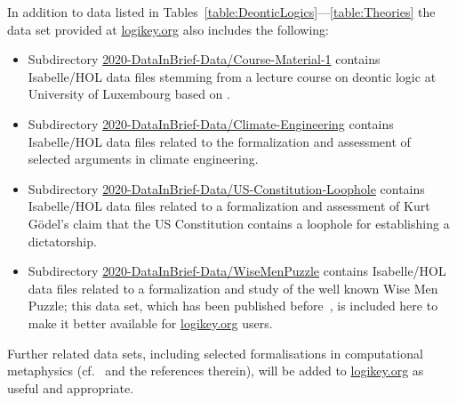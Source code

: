 \documentclass{article}
\begin{document}
In addition to data listed in
Tables~\ref{table:DeonticLogics}---\ref{table:Theories} the data set
provided at \url{logikey.org} also includes the following:
\begin{itemize}
\item Subdirectory \url{2020-DataInBrief-Data/Course-Material-1} contains Isabelle/HOL data files stemming from a
  lecture course on deontic logic at University of Luxembourg based on \cite{textbook18}.
\item Subdirectory \url{2020-DataInBrief-Data/Climate-Engineering} contains Isabelle/HOL data files related to the
  formalization and assessment  \cite{C82}  of selected arguments in climate engineering.
\item  Subdirectory \url{2020-DataInBrief-Data/US-Constitution-Loophole} contains Isabelle/HOL data files related to a 
  formalization and assessment  \cite{zahoransky19} of Kurt G\"odel's claim that the US Constitution contains a
  loophole for establishing a dictatorship.
\item  Subdirectory \url{2020-DataInBrief-Data/WiseMenPuzzle} contains Isabelle/HOL data files related to a 
  formalization and study \cite{J41} of the well known Wise Men
  Puzzle; this data set, which has been published before~\cite{J44}, is
  included here to make it better available for 
  \url{logikey.org} users.
\end{itemize}

Further related data sets, including
  selected formalisations in computational metaphysics
  (cf.~\cite{J41,J47} and the references therein), will be added to 
   \url{logikey.org} as useful and appropriate.

\end{document}
